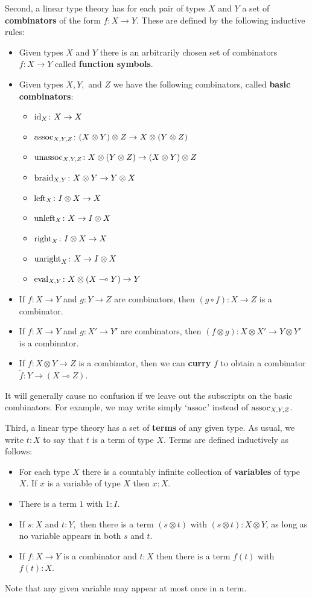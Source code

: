 \documentclass[12pt,twoside,openright]{report}
\newcommand{\maps}{\colon}
\newcommand{\lhom}{\multimap}
\newcommand{\tensor}{\otimes}
\newcommand{\Id}{{\rm id}}
\newcommand{\eval}{{\rm eval}}
\newcommand{\assoc}{{\rm assoc}}
\newcommand{\unassoc}{{\rm unassoc}}
\newcommand{\braid}{{\rm braid}}
\newcommand{\Left}{{\rm left}}
\newcommand{\Right}{{\rm right}}
\newcommand{\unright}{{\rm unright}}
\newcommand{\unleft}{{\rm unleft}}
\begin{document}
Second, a linear type theory has for each pair of types $X$ and $Y$
a set of \textbf{combinators} of the form $f\maps X \to Y$. These are defined by the following inductive rules:
\begin{itemize}
  \item Given types $X$ and $Y$ there is an arbitrarily chosen set
        of combinators $f\maps X\to Y$ called \textbf{function symbols}.
  \item Given types $X,Y,$ and $Z$ we have the following combinators,
        called \textbf{basic combinators}:
    \begin{itemize}
      \item $\Id_X \maps X \to X$
      \item $\assoc_{X,Y,Z}
      \maps (X\tensor Y)\tensor Z \to X \tensor (Y \tensor Z)$
      \item $\unassoc_{X,Y,Z}
      \maps X \tensor (Y \tensor Z) \to (X \tensor Y)\tensor Z$
      \item $\braid_{X,Y}\maps X \tensor Y \to Y \tensor X$ 
      \item $\Left_X \maps I \tensor X \to X$
      \item $\unleft_X \maps X \to I \tensor X$
      \item $\Right_X \maps I \tensor X \to X$
      \item $\unright_X \maps X \to I \tensor X$
      \item $\eval_{X,Y} \maps X \tensor (X \lhom Y) \to Y$      
    \end{itemize}
  \item If ${f\maps X \to Y}$ and ${g\maps Y \to Z}$ are combinators, then 
    $(g \circ f) \maps X \to Z$ is a combinator.
  \item If ${f\maps X \to Y}$ and ${g\maps X' \to Y'}$ are combinators, then
    ${(f \tensor g) \maps X \tensor X' \to Y \tensor Y'}$ is a combinator.
  \item If ${f\maps X \tensor Y \to Z}$ is a combinator, then we can
   {\bf curry} $f$ to obtain a combinator
    $\tilde{f} \maps Y \to (X \lhom Z)$.
\end{itemize}
It will generally cause no confusion if we leave out the subscripts on the basic combinators.  For example, we may write simply `$\assoc$'
instead of $\assoc_{X,Y,Z}$.

Third, a linear type theory has a set of {\bf terms} of any given type. As usual, we write $t:X$ to say that $t$ is a term of type $X$.  Terms are defined inductively as follows:
\begin{itemize}
  \item  For each type $X$ there is a countably infinite collection of 
\textbf{variables} of type $X$.  If $x$ is a variable of type $X$ then 
$x:X$.
  \item There is a term $1$ with $1:I$.
  \item If $s:X$ and $t:Y,$ then there is a term $(s \tensor t)$ with
$(s \tensor t): X \tensor Y$, as long as no variable appears in both $s$
and $t$.
  \item If $f \maps X \to Y$ is a combinator and $t:X$ then there is a term $f(t)$ with $f(t):X$.
\end{itemize}
Note that any given variable may appear at most once in a term.
\end{document}
